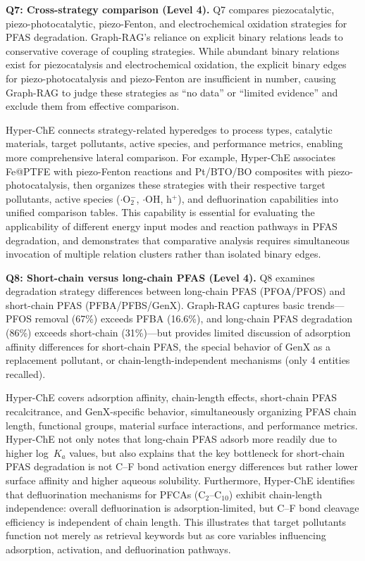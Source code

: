 \documentclass[11pt,a4paper]{article}
\begin{document}
\textbf{Q7: Cross-strategy comparison (Level 4).} Q7 compares piezocatalytic, piezo-photocatalytic, piezo-Fenton, and electrochemical oxidation strategies for PFAS degradation. Graph-RAG's reliance on explicit binary relations leads to conservative coverage of coupling strategies. While abundant binary relations exist for piezocatalysis and electrochemical oxidation, the explicit binary edges for piezo-photocatalysis and piezo-Fenton are insufficient in number, causing Graph-RAG to judge these strategies as ``no data'' or ``limited evidence'' and exclude them from effective comparison.

Hyper-ChE connects strategy-related hyperedges to process types, catalytic materials, target pollutants, active species, and performance metrics, enabling more comprehensive lateral comparison. For example, Hyper-ChE associates Fe@PTFE with piezo-Fenton reactions and Pt/BTO/BO composites with piezo-photocatalysis, then organizes these strategies with their respective target pollutants, active species ($\cdot$O$_2^-$, $\cdot$OH, h$^+$), and defluorination capabilities into unified comparison tables. This capability is essential for evaluating the applicability of different energy input modes and reaction pathways in PFAS degradation, and demonstrates that comparative analysis requires simultaneous invocation of multiple relation clusters rather than isolated binary edges.

\textbf{Q8: Short-chain versus long-chain PFAS (Level 4).} Q8 examines degradation strategy differences between long-chain PFAS (PFOA/PFOS) and short-chain PFAS (PFBA/PFBS/GenX). Graph-RAG captures basic trends---PFOS removal (67\%) exceeds PFBA (16.6\%), and long-chain PFAS degradation (86\%) exceeds short-chain (31\%)---but provides limited discussion of adsorption affinity differences for short-chain PFAS, the special behavior of GenX as a replacement pollutant, or chain-length-independent mechanisms (only 4 entities recalled).

Hyper-ChE covers adsorption affinity, chain-length effects, short-chain PFAS recalcitrance, and GenX-specific behavior, simultaneously organizing PFAS chain length, functional groups, material surface interactions, and performance metrics. Hyper-ChE not only notes that long-chain PFAS adsorb more readily due to higher log~$K_a$ values, but also explains that the key bottleneck for short-chain PFAS degradation is not C--F bond activation energy differences but rather lower surface affinity and higher aqueous solubility. Furthermore, Hyper-ChE identifies that defluorination mechanisms for PFCAs (C$_2$--C$_{10}$) exhibit chain-length independence: overall defluorination is adsorption-limited, but C--F bond cleavage efficiency is independent of chain length. This illustrates that target pollutants function not merely as retrieval keywords but as core variables influencing adsorption, activation, and defluorination pathways.
\end{document}

